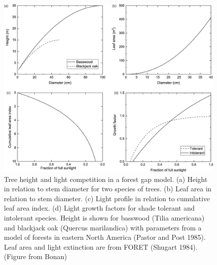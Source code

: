 \documentclass[
  12pt,
  oneside]{book}
\begin{document}
\begin{figure}

{\centering \includegraphics[width=0.8\linewidth]{figures/chap6/f624_growthfactor} 

}

\caption{Tree height and light competition in a forest gap model. (a) Height in relation to stem diameter for two species of trees. (b) Leaf area in relation to stem diameter. (c) Light profile in relation to cumulative leaf area index. (d) Light growth factors for shade tolerant and intolerant species. Height is shown for basswood (Tilia americana) and blackjack oak (Quercus marilandica) with parameters from a model of forests in eastern North America (Pastor and Post 1985). Leaf area and light extinction are from FORET (Shugart 1984). (Figure from Bonan)}\label{fig:f624}
\end{figure}
\end{document}
